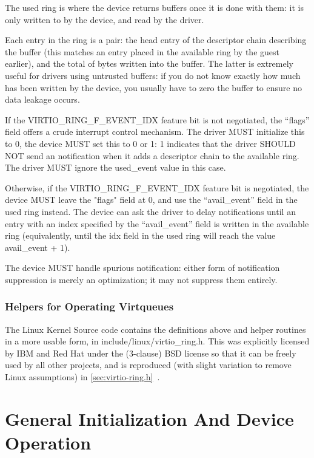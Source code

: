 The used ring is where the device returns buffers once it is done with
them: it is only written to by the device, and read by the driver.

Each entry in the ring is a pair: the head entry of the
descriptor chain describing the buffer (this matches an entry
placed in the available ring by the guest earlier), and the total
of bytes written into the buffer. The latter is extremely useful
for drivers using untrusted buffers: if you do not know exactly
how much has been written by the device, you usually have to zero
the buffer to ensure no data leakage occurs.

If the VIRTIO_RING_F_EVENT_IDX feature bit is not negotiated, the
“flags” field offers a crude interrupt control mechanism.  The driver
MUST initialize this to 0, the device MUST set this to 0 or 1: 1
indicates that the driver SHOULD NOT send an notification when it adds
a descriptor chain to the available ring.  The driver MUST ignore the
used_event value in this case.

Otherwise, if the VIRTIO_RING_F_EVENT_IDX feature bit is negotiated,
the device MUST leave the "flags" field at 0, and use the
“avail_event” field in the used ring instead.  The device can ask the
driver to delay notifications until an entry with an index specified
by the “avail_event” field is written in the available ring (equivalently,
until the idx field in the used ring will reach the value avail_event +
1).

The device MUST handle spurious notification: either form of
notification suppression is merely an optimization; it may not
suppress them entirely.

\subsection{Helpers for Operating Virtqueues}\label{sec:Basic Facilities of a Virtio Device / Virtqueues / Helpers for Operating Virtqueues}

The Linux Kernel Source code contains the definitions above and
helper routines in a more usable form, in
include/linux/virtio_ring.h. This was explicitly licensed by IBM
and Red Hat under the (3-clause) BSD license so that it can be
freely used by all other projects, and is reproduced (with slight
variation to remove Linux assumptions) in \ref{sec:virtio-ring.h}~.

\chapter{General Initialization And Device Operation}\label{sec:General Initialization And Device Operation}

